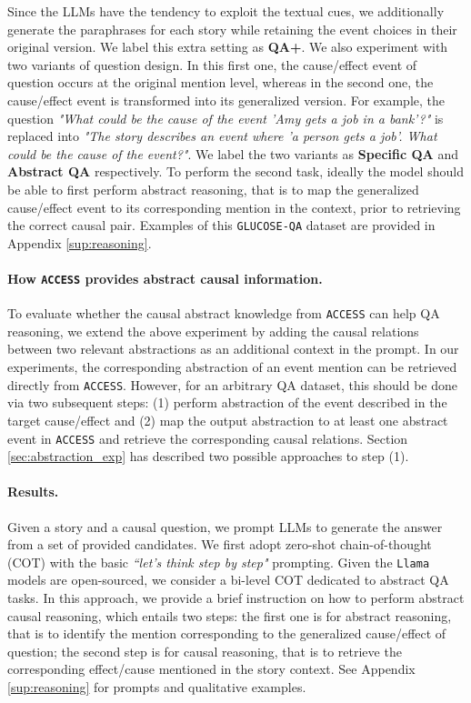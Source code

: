 Since the LLMs have the tendency to exploit the textual cues, we additionally generate the paraphrases for each story while retaining the event choices in their original version. We label this extra setting as \textbf{QA+}. We also experiment with two variants of question design. In this first one, the cause/effect event of question occurs at the original mention level, whereas in the second one, the cause/effect event is transformed into its generalized version. For example, the question \textit{"What could be the cause of the event 'Amy gets a job in a bank'?"} is replaced into \textit{"The story describes an event where 'a person gets a job'. What could be the cause of the event?"}. We label the two variants as \textbf{Specific QA} and \textbf{Abstract QA} respectively. To perform the second task, ideally the model should be able to first perform abstract reasoning, that is to map the generalized cause/effect event to its corresponding mention in the context, prior to retrieving the correct causal pair. Examples of this \texttt{GLUCOSE-QA} dataset are provided in Appendix \ref{sup:reasoning}. 

\paragraph{How \texttt{ACCESS} provides abstract causal information.} To evaluate whether the causal abstract knowledge from \texttt{ACCESS} can help QA reasoning, we extend the above experiment by adding the causal relations between two relevant abstractions as an additional context in the prompt. In our experiments, the corresponding abstraction of an event mention can be retrieved directly from \texttt{ACCESS}. However, for an arbitrary QA dataset, this should be done via two subsequent steps: (1) perform abstraction of the event described in the target cause/effect and (2) map the output abstraction to at least one abstract event in \texttt{ACCESS} and retrieve the corresponding causal relations. Section \ref{sec:abstraction_exp} has described two possible approaches to step (1). 

\paragraph{Results.}
Given a story and a causal question, we prompt LLMs to generate the answer from a set of provided candidates. We first adopt zero-shot chain-of-thought (COT) \citep{kojima2022large} with the basic \textit{``let's think step by step"} prompting. Given the \texttt{Llama} models are open-sourced, we consider a bi-level COT dedicated to abstract QA tasks. In this approach, we provide a brief instruction on how to perform abstract causal reasoning, which entails two steps: the first one is for abstract reasoning, that is to identify the mention corresponding to the generalized cause/effect of question; the second step is for causal reasoning, that is to retrieve the corresponding effect/cause mentioned in the story context. See Appendix \ref{sup:reasoning} for prompts and qualitative examples.  

